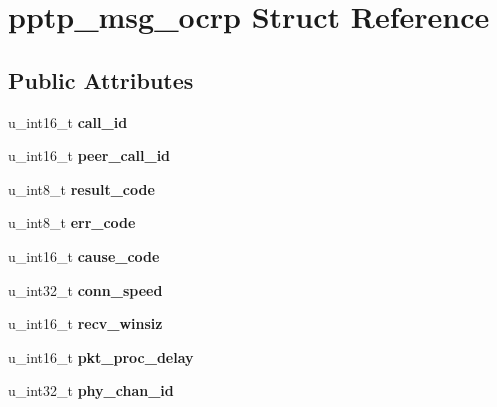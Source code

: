 \hypertarget{structpptp__msg__ocrp}{
\section{pptp\_\-msg\_\-ocrp Struct Reference}
\label{structpptp__msg__ocrp}
}
\subsection*{Public Attributes}
\begin{DoxyCompactItemize}
\item 
\hypertarget{structpptp__msg__ocrp_ab72a2aedcf69d1ad95dcbd0a3c941f46}{
u\_\-int16\_\-t {\bfseries call\_\-id}}
\label{structpptp__msg__ocrp_ab72a2aedcf69d1ad95dcbd0a3c941f46}

\item 
\hypertarget{structpptp__msg__ocrp_af9f3783aa61db76b7e5f8853500b1bb4}{
u\_\-int16\_\-t {\bfseries peer\_\-call\_\-id}}
\label{structpptp__msg__ocrp_af9f3783aa61db76b7e5f8853500b1bb4}

\item 
\hypertarget{structpptp__msg__ocrp_a552833de3da027defb4868832e91c544}{
u\_\-int8\_\-t {\bfseries result\_\-code}}
\label{structpptp__msg__ocrp_a552833de3da027defb4868832e91c544}

\item 
\hypertarget{structpptp__msg__ocrp_a20d2794ac42b754455b9ecf74556e651}{
u\_\-int8\_\-t {\bfseries err\_\-code}}
\label{structpptp__msg__ocrp_a20d2794ac42b754455b9ecf74556e651}

\item 
\hypertarget{structpptp__msg__ocrp_a3a7700206bb7eebad74ebf268b6c2452}{
u\_\-int16\_\-t {\bfseries cause\_\-code}}
\label{structpptp__msg__ocrp_a3a7700206bb7eebad74ebf268b6c2452}

\item 
\hypertarget{structpptp__msg__ocrp_a824bd63f0a8bb5e2eae35c0dfc4e62f8}{
u\_\-int32\_\-t {\bfseries conn\_\-speed}}
\label{structpptp__msg__ocrp_a824bd63f0a8bb5e2eae35c0dfc4e62f8}

\item 
\hypertarget{structpptp__msg__ocrp_a7c5a3aed4b5550cd08b60340902fb85d}{
u\_\-int16\_\-t {\bfseries recv\_\-winsiz}}
\label{structpptp__msg__ocrp_a7c5a3aed4b5550cd08b60340902fb85d}

\item 
\hypertarget{structpptp__msg__ocrp_a6d78709e8e5b1901adf61e06f65c26ae}{
u\_\-int16\_\-t {\bfseries pkt\_\-proc\_\-delay}}
\label{structpptp__msg__ocrp_a6d78709e8e5b1901adf61e06f65c26ae}

\item 
\hypertarget{structpptp__msg__ocrp_aca7e838bb99bd1bba60e9b2167aa2bf1}{
u\_\-int32\_\-t {\bfseries phy\_\-chan\_\-id}}
\label{structpptp__msg__ocrp_aca7e838bb99bd1bba60e9b2167aa2bf1}

\end{DoxyCompactItemize}


